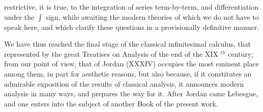 restrictive, it is true, to the integration of series term-by-term, and differentiation under the \(\int\) sign, while awaiting the modern theories of which we do not have to speak here, and which clarify these questions in a provisionally definitive manner.

We have thus reached the final stage of the classical infinitesimal calculus, that represented by the great Treatises on Analysis of the end of the XIX \(^{th}\) century; from our point of view, that of Jordan (XXXIV) occupies the most eminent place among them, in part for aesthetic reasons, but also because, if it constitutes an admirable exposition of the results of classical analysis, it announces modern analysis in many ways, and prepares the way for it. After Jordan came Lebesgue, and one enters into the subject of another Book of the present work.

